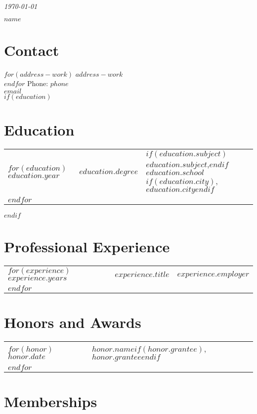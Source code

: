 \documentclass[martgin, line]{article}
\begin{document}
\begin{flushright}
  \textit{\today}
\end{flushright}



\begin{LARGE}
  \textbf{$name$}
\end{LARGE}

\section*{Contact}

$for(address-work)$
$address-work$\\
$endfor$
Phone: $phone$\\
\href{mailto:$email$}{$email$}\\


$if(education)$
\section*{Education}
\noindent
\begin{tabular}{lll}
$for(education)$
$education.year$&$education.degree$&
$if(education.subject)$$education.subject$,$endif$
$education.school$$if(education.city)$, $education.city$$endif$\\
$endfor$
\end{tabular}
$endif$

\section*{Professional Experience}
\noindent
\begin{tabular}{lll}
$for(experience)$
$experience.years$&
$experience.title$&
$experience.employer$\\
$endfor$
\end{tabular}

\section*{Honors and Awards}
\begin{tabular}{lp{5.5in}}
$for(honor)$
$honor.date$&
$honor.name$$if(honor.grantee)$, $honor.grantee$$endif$
\\
$endfor$
\end{tabular}


\section*{Memberships}
\end{document}
